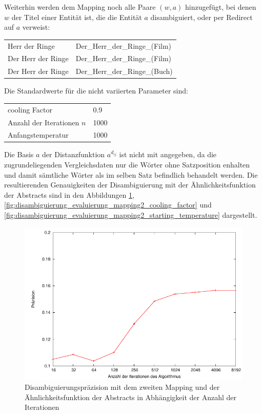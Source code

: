 Weiterhin werden dem Mapping noch alle Paare $(w,a)$ hinzugefügt, bei denen $w$ der Titel einer Entität ist, die die Entität $a$ disambiguiert, oder per Redirect auf $a$ verweist:

\begin{center}
\begin{tabular}{ll}
\toprule
Herr der Ringe		&Der\_Herr\_der\_Ringe\_(Film)\\
Der Herr der Ringe	&Der\_Herr\_der\_Ringe\_(Film)\\
Der Herr der Ringe	&Der\_Herr\_der\_Ringe\_(Buch)\\
\bottomrule
\end{tabular}
\end{center}

Die Standardwerte für die nicht variierten Parameter sind:

\begin{center}
\begin{tabular}{ll}
\toprule
cooling Factor			&0.9\\
Anzahl der Iterationen $n$	&1000\\
Anfangstemperatur		&1000\\
\bottomrule
\end{tabular}
\end{center}

Die Basis $a$ der Distanzfunktion $a^{d_{ij}}$ ist nicht mit angegeben, da die zugrundeliegenden Vergleichsdaten nur die Wörter ohne Satzposition enhalten und damit sämtliche Wörter als im selben Satz befindlich
 behandelt werden.
Die resultierenden Genauigkeiten der Disambiguierung mit der Ähnlichkeitsfunktion der Abstracts sind in den Abbildungen 
\ref{fig:disambiguierung_evaluierung_mapping2_n}, \ref{fig:disambiguierung_evaluierung_mapping2_cooling_factor} und \ref{fig:disambiguierung_evaluierung_mapping2_starting_temperature} dargestellt.

\begin{figure}[tbh]
\includegraphics[height=0.4\textheight]{img/pdf/mapping2/n.pdf}
\caption[]{Disambiguierungspräzision mit dem zweiten Mapping und der Ähnlichkeitsfunktion der Abstracts in Abhängigkeit der Anzahl der Iterationen}
\label{fig:disambiguierung_evaluierung_mapping2_n}
\end{figure}

